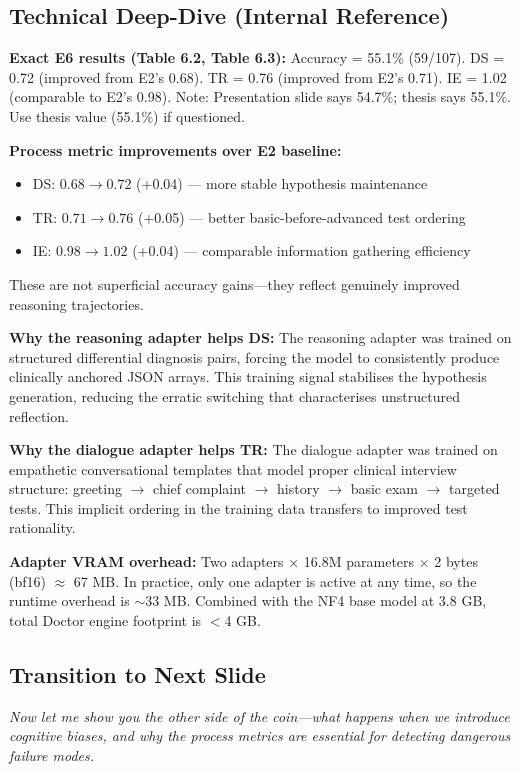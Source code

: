 \subsection*{Technical Deep-Dive (Internal Reference)}
{\color{techgray}
\textbf{Exact E6 results (Table 6.2, Table 6.3):} Accuracy = 55.1\% (59/107). DS = 0.72 (improved from E2's 0.68). TR = 0.76 (improved from E2's 0.71). IE = 1.02 (comparable to E2's 0.98). Note: Presentation slide says 54.7\%; thesis says 55.1\%. Use thesis value (55.1\%) if questioned.

\textbf{Process metric improvements over E2 baseline:}
\begin{itemize}
  \item DS: $0.68 \to 0.72$ (+0.04) --- more stable hypothesis maintenance
  \item TR: $0.71 \to 0.76$ (+0.05) --- better basic-before-advanced test ordering
  \item IE: $0.98 \to 1.02$ (+0.04) --- comparable information gathering efficiency
\end{itemize}
These are not superficial accuracy gains---they reflect genuinely improved reasoning trajectories.

\textbf{Why the reasoning adapter helps DS:} The reasoning adapter was trained on structured differential diagnosis pairs, forcing the model to consistently produce clinically anchored JSON arrays. This training signal stabilises the hypothesis generation, reducing the erratic switching that characterises unstructured reflection.

\textbf{Why the dialogue adapter helps TR:} The dialogue adapter was trained on empathetic conversational templates that model proper clinical interview structure: greeting $\to$ chief complaint $\to$ history $\to$ basic exam $\to$ targeted tests. This implicit ordering in the training data transfers to improved test rationality.

\textbf{Adapter VRAM overhead:} Two adapters $\times$ 16.8M parameters $\times$ 2 bytes (bf16) $\approx$ 67 MB. In practice, only one adapter is active at any time, so the runtime overhead is $\sim$33 MB. Combined with the NF4 base model at 3.8 GB, total Doctor engine footprint is $<$4 GB.
}

\subsection*{Transition to Next Slide}
{\color{transgreen}
\textit{Now let me show you the other side of the coin---what happens when we introduce cognitive biases, and why the process metrics are essential for detecting dangerous failure modes.}
}

